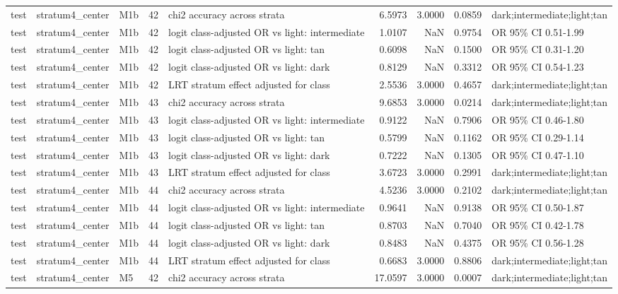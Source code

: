 \begin{tabular}{lllrlrrrl}
test & stratum4\_center & M1b & 42 & chi2 accuracy across strata & 6.5973 & 3.0000 & 0.0859 & dark;intermediate;light;tan \\
test & stratum4\_center & M1b & 42 & logit class-adjusted OR vs light: intermediate & 1.0107 & NaN & 0.9754 & OR 95\% CI 0.51-1.99 \\
test & stratum4\_center & M1b & 42 & logit class-adjusted OR vs light: tan & 0.6098 & NaN & 0.1500 & OR 95\% CI 0.31-1.20 \\
test & stratum4\_center & M1b & 42 & logit class-adjusted OR vs light: dark & 0.8129 & NaN & 0.3312 & OR 95\% CI 0.54-1.23 \\
test & stratum4\_center & M1b & 42 & LRT stratum effect adjusted for class & 2.5536 & 3.0000 & 0.4657 & dark;intermediate;light;tan \\
test & stratum4\_center & M1b & 43 & chi2 accuracy across strata & 9.6853 & 3.0000 & 0.0214 & dark;intermediate;light;tan \\
test & stratum4\_center & M1b & 43 & logit class-adjusted OR vs light: intermediate & 0.9122 & NaN & 0.7906 & OR 95\% CI 0.46-1.80 \\
test & stratum4\_center & M1b & 43 & logit class-adjusted OR vs light: tan & 0.5799 & NaN & 0.1162 & OR 95\% CI 0.29-1.14 \\
test & stratum4\_center & M1b & 43 & logit class-adjusted OR vs light: dark & 0.7222 & NaN & 0.1305 & OR 95\% CI 0.47-1.10 \\
test & stratum4\_center & M1b & 43 & LRT stratum effect adjusted for class & 3.6723 & 3.0000 & 0.2991 & dark;intermediate;light;tan \\
test & stratum4\_center & M1b & 44 & chi2 accuracy across strata & 4.5236 & 3.0000 & 0.2102 & dark;intermediate;light;tan \\
test & stratum4\_center & M1b & 44 & logit class-adjusted OR vs light: intermediate & 0.9641 & NaN & 0.9138 & OR 95\% CI 0.50-1.87 \\
test & stratum4\_center & M1b & 44 & logit class-adjusted OR vs light: tan & 0.8703 & NaN & 0.7040 & OR 95\% CI 0.42-1.78 \\
test & stratum4\_center & M1b & 44 & logit class-adjusted OR vs light: dark & 0.8483 & NaN & 0.4375 & OR 95\% CI 0.56-1.28 \\
test & stratum4\_center & M1b & 44 & LRT stratum effect adjusted for class & 0.6683 & 3.0000 & 0.8806 & dark;intermediate;light;tan \\
test & stratum4\_center & M5 & 42 & chi2 accuracy across strata & 17.0597 & 3.0000 & 0.0007 & dark;intermediate;light;tan \\

\end{tabular}
